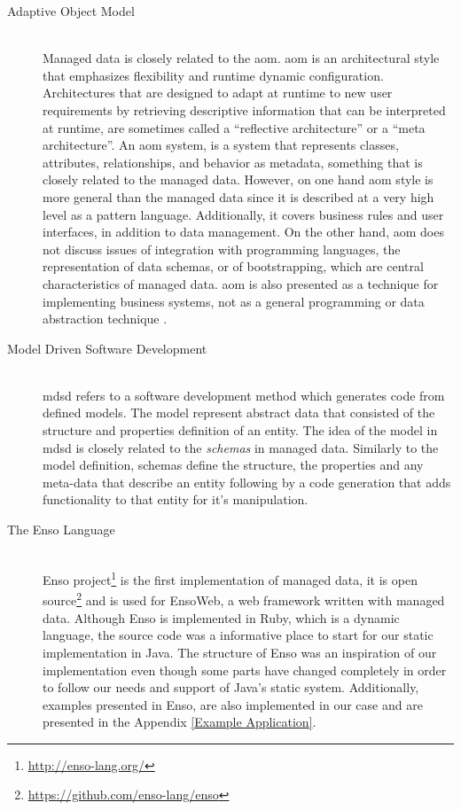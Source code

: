 \begin{description}
  \item[Adaptive Object Model]~\\
  Managed data \cite{loh2012managed} is closely related to the \ac{aom}. \ac{aom} \cite{yoder2002adaptive} is an architectural style that emphasizes flexibility and runtime dynamic configuration. 
  Architectures that are designed to adapt at runtime to new user requirements by retrieving descriptive information that can be interpreted at runtime, are sometimes called a ``reflective architecture'' or a ``meta architecture''. 
  An \ac{aom} system, is a system that represents classes, attributes, relationships, and behavior as metadata, something that is closely related to the managed data.
  However, on one hand \ac{aom} style is more general than the managed data since it is described at a very high level as a pattern language. Additionally, it covers business rules and user interfaces, in addition to data management. 
  On the other hand, \ac{aom} does not discuss issues of integration with programming languages, the representation of data schemas, or of bootstrapping, which are central characteristics of managed data. \ac{aom} is also presented as a technique for implementing business systems, not as a general programming or data abstraction technique \cite{loh2012managed}.

  \item[Model Driven Software Development]~\\
  \ac{mdsd} refers to a software development method which generates code from defined models. 
  The model represent abstract data that consisted of the structure and properties definition of an entity.
  The idea of the model in \ac{mdsd} is closely related to the \textit{schemas} in managed data.
  Similarly to the model definition, schemas define the structure, the properties and any meta-data that describe an entity
  following by a code generation that adds functionality to that entity for it's manipulation.

  \item[The Enso Language]~\\
  Enso project\footnote{\url{http://enso-lang.org/}} is the first implementation of managed data, 
  it is open source\footnote{\url{https://github.com/enso-lang/enso}} and is used for EnsoWeb, a web framework written with managed data.
  Although Enso is implemented in Ruby, which is a dynamic language, the source code was a informative place to start for our static implementation in Java. 
  The structure of Enso was an inspiration of our implementation even though some parts have changed completely in order to follow our needs and support of Java's static system.
  Additionally, examples presented in Enso, are also implemented in our case and are presented in the Appendix \ref{Example Application}.


\end{description}
